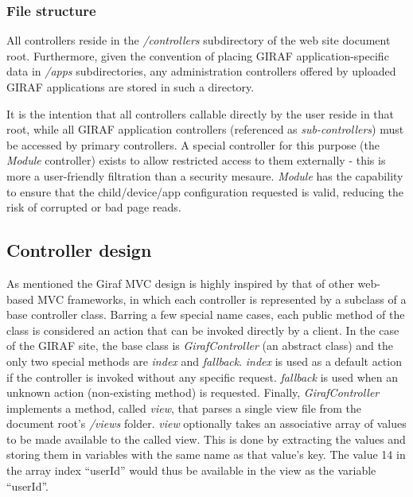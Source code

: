 \subsubsection*{File structure}
All controllers reside in the \emph{/controllers} subdirectory of the web site document root. Furthermore, given the convention of placing GIRAF application-specific data in \emph{/apps} subdirectories, any administration controllers offered by uploaded GIRAF applications are stored in such a directory.

It is the intention that all controllers callable directly by the user reside in that root, while all GIRAF application controllers (referenced as \emph{sub-controllers}) must be accessed by primary controllers. A special controller for this purpose (the \emph{Module} controller) exists to allow restricted access to them externally - this is more a user-friendly filtration than a security mesaure. \emph{Module} has the capability to ensure that the child/device/app configuration requested is valid, reducing the risk of corrupted or bad page reads.

\subsection{Controller design}
\label{controller_design}
As mentioned the Giraf MVC design is highly inspired by that of other web-based MVC frameworks, in which each controller is represented by a subclass of a base controller class. Barring a few special name cases, each public method of the class is considered an action that can be invoked directly by a client.
In the case of the GIRAF site, the base class is \emph{GirafController} (an abstract class) and the only two special methods are \emph{index} and \emph{fallback}. \emph{index} is used as a default action if the controller is invoked without any specific request. \emph{fallback} is used when an unknown action (non-existing method) is requested.
Finally, \emph{GirafController} implements a method, called \emph{view}, that parses a single view file from the document root's \emph{/views} folder. \emph{view} optionally takes an associative array of values to be made available to the called view. This is done by extracting the values and storing them in variables with the same name as that value's key. The value 14 in the array index ``userId'' would thus be available in the view as the variable ``userId''.

